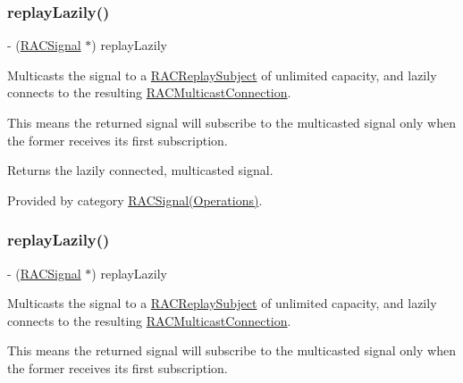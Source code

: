 \subsubsection{\texorpdfstring{replay\+Lazily()}{replayLazily()}\hspace{0.1cm}{\footnotesize\ttfamily [1/3]}}
{\footnotesize\ttfamily -\/ (\mbox{\hyperlink{interface_r_a_c_signal}{R\+A\+C\+Signal}} $\ast$) replay\+Lazily \begin{DoxyParamCaption}{ }\end{DoxyParamCaption}}

Multicasts the signal to a \mbox{\hyperlink{interface_r_a_c_replay_subject}{R\+A\+C\+Replay\+Subject}} of unlimited capacity, and lazily connects to the resulting \mbox{\hyperlink{interface_r_a_c_multicast_connection}{R\+A\+C\+Multicast\+Connection}}.

This means the returned signal will subscribe to the multicasted signal only when the former receives its first subscription.

Returns the lazily connected, multicasted signal. 

Provided by category \mbox{\hyperlink{category_r_a_c_signal_07_operations_08_aa1a3386d321ec82ceff16d98eaf74d33}{R\+A\+C\+Signal(\+Operations)}}.

\mbox{\label{interface_r_a_c_signal_aa1a3386d321ec82ceff16d98eaf74d33}} 
\subsubsection{\texorpdfstring{replay\+Lazily()}{replayLazily()}\hspace{0.1cm}{\footnotesize\ttfamily [2/3]}}
{\footnotesize\ttfamily -\/ (\mbox{\hyperlink{interface_r_a_c_signal}{R\+A\+C\+Signal}} $\ast$) replay\+Lazily \begin{DoxyParamCaption}{ }\end{DoxyParamCaption}}

Multicasts the signal to a \mbox{\hyperlink{interface_r_a_c_replay_subject}{R\+A\+C\+Replay\+Subject}} of unlimited capacity, and lazily connects to the resulting \mbox{\hyperlink{interface_r_a_c_multicast_connection}{R\+A\+C\+Multicast\+Connection}}.

This means the returned signal will subscribe to the multicasted signal only when the former receives its first subscription.

